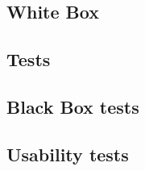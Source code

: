 \subsection{White Box}


\subsection{Tests}

\subsection{Black Box tests}


\subsection{Usability tests}


